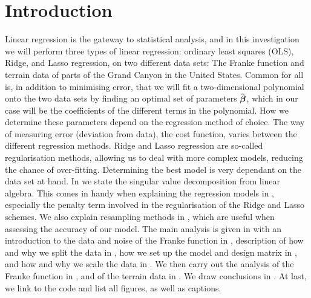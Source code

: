 \section{Introduction}\label{sec:intro}
Linear regression is the gateway to statistical analysis, and in this investigation we will perform three types of linear regression: ordinary least squares (OLS), Ridge, and Lasso regression, on two different data sets: The Franke function and terrain data of parts of the Grand Canyon in the United States. Common for all is, in addition to minimising error, that we will fit a two-dimensional polynomial onto the two data sets by finding an optimal set of parameters $\hat{\boldsymbol{\beta}}$, which in our case will be the coefficients of the different terms in the polynomial. How we determine these parameters depend on the regression method of choice. The way of measuring error (deviation from data), the cost function, varies between the different regression methods. Ridge and Lasso regression are so-called regularisation methods, allowing us to deal with more complex models, reducing the chance of over-fitting. Determining the best model is very dependant on the data set at hand. In  we state the singular value decomposition from linear algebra. This comes in handy when explaining the regression models in , especially the penalty term involved in the regularisation of the Ridge and Lasso schemes. We also explain resampling methods in , which are useful when assessing the accuracy of our model. The main analysis is given in  with an introduction to the data and noise of the Franke function in , description of how and why we split the data in , how we set up the model and design matrix in , and how and why we scale the data in . We then carry out the analysis of the Franke function in , and of the terrain data in . We draw conclusions in . At last, we link to the code and list all figures, as well as captions.